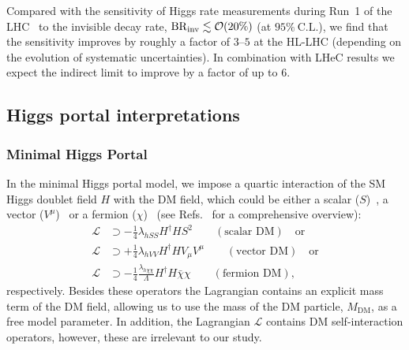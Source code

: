 \documentclass[../report.tex]{subfiles}
\begin{document}
{Compared with the sensitivity of Higgs rate measurements during Run~1 of the LHC~\cite{Khachatryan:2016vau} to the invisible decay rate, $\mathrm{BR}_\mathrm{inv} \lesssim \mathcal{O}({20\%})$} (at $95\%~\mathrm{C.L.}$), we find that the sensitivity improves by roughly a factor of $3$--$5$  at the HL-LHC (depending on the evolution of systematic uncertainties). In combination with LHeC results we expect the indirect limit to improve by a factor of up to $6$.



\subsection{Higgs portal interpretations}

\subsubsection{Minimal Higgs Portal}
\label{sec6:minimalHP}

In the minimal Higgs portal model, we impose a quartic interaction of the SM Higgs doublet field $H$ with the DM field, which could be either a scalar ($S$)~\cite{Silveira:1985rk}, a vector ($V^\mu$)~\cite{Lebedev:2011iq} or a fermion ($\chi$)~\cite{Kim:2006af} (see Refs.~\cite{Kanemura:2010sh,Djouadi:2011aa} for a comprehensive overview):
\begin{align}
\mathcal{L} &\supset -\tfrac{1}{4} \lambda_{hSS} H^\dagger H S^2 \qquad (\mbox{scalar~DM}) \quad \mbox{or} \label{eq:scalarDM}\\
\mathcal{L} &\supset +\tfrac{1}{4}  \lambda_{hVV} H^\dagger H V_\mu V^\mu \qquad (\mbox{vector~DM}) \quad \mbox{or} \label{eq:vectorDM}\\
\mathcal{L} &\supset -\tfrac{1}{4}  \tfrac{\lambda_{h\chi\chi}}{\Lambda} H^\dagger H \bar{\chi} \chi \qquad (\mbox{fermion~DM}), \label{eq:fermionDM}
\end{align}
respectively. Besides these operators the Lagrangian contains an explicit mass term of the DM field, allowing us to use the mass of the DM particle, $M_\text{DM}$, as a free model parameter. In addition, the Lagrangian $\mathcal{L}$ contains DM self-interaction operators, however, these are irrelevant to our study.
\end{document}
